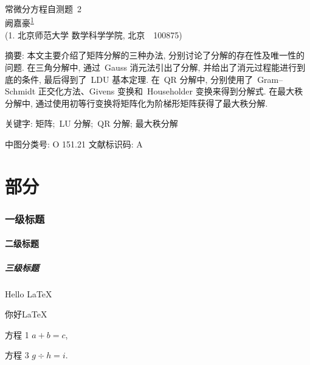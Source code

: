 \documentclass[UTF8, a4paper, 12pt, oneside, onecolumn]{article}
\begin{document}
\thispagestyle{plain}

\begin{center}
	{\heiti 常微分方程自测题~2} \\
	\vspace{1.5ex}
	{\fangsong 阙嘉豪\textsuperscript{\hyperref[auth:1]{1}}%
	} \\
	{\songti \label{auth:1}(1. 北京师范大学 数学科学学院, 北京~~100875)}
\end{center}

{\heiti 摘要: \songti 本文主要介绍了矩阵分解的三种办法, 分别讨论了分解的存在性及唯一性的问题. 在三角分解中, 通过~Gauss 消元法引出了分解, 并给出了消元过程能进行到底的条件, 最后得到了~LDU 基本定理. 在~QR 分解中, 分别使用了~Gram–Schmidt 正交化方法、Givens 变换和~Householder 变换来得到分解式. 在最大秩分解中, 通过使用初等行变换将矩阵化为阶梯形矩阵获得了最大秩分解.}

{\heiti 关键字: \songti 矩阵;~LU 分解;~QR 分解; 最大秩分解}

{\heiti 中图分类号: O 151.21 \qquad\quad 文献标识码: A \qquad\quad}

\tableofcontents



\part{部分}
\section{一级标题}
\subsection{二级标题}
\subsubsection{三级标题}

Hello \LaTeX

你好\LaTeX

方程 1 $ a + b = c $,

方程 3 \begin{math}  g \div h = i \end{math}. %
\end{document}
